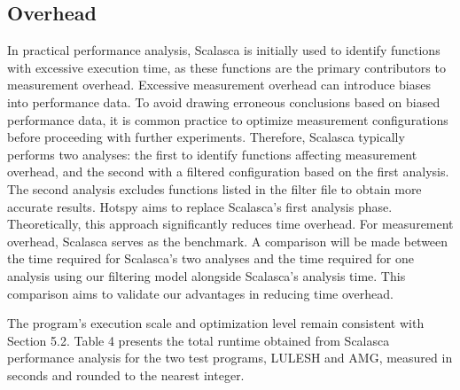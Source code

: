 \documentclass[lineno,sn-mathphys]{sn-jnl}%
\theoremstyle{thmstyleone}%
\theoremstyle{thmstyletwo}%
\theoremstyle{thmstylethree}%
\begin{document}
 \subsection{Overhead}
 In practical performance analysis, Scalasca is initially used to identify functions with excessive execution time, as these functions are the primary contributors to measurement overhead. Excessive measurement overhead can introduce biases into performance data. To avoid drawing erroneous conclusions based on biased performance data, it is common practice to optimize measurement configurations before proceeding with further experiments. Therefore, Scalasca typically performs two analyses: the first to identify functions affecting measurement overhead, and the second with a filtered configuration based on the first analysis. The second analysis excludes functions listed in the filter file to obtain more accurate results. Hotspy aims to replace Scalasca's first analysis phase. Theoretically, this approach significantly reduces time overhead. For measurement overhead, Scalasca serves as the benchmark. A comparison will be made between the time required for Scalasca's two analyses and the time required for one analysis using our filtering model alongside Scalasca's analysis time. This comparison aims to validate our advantages in reducing time overhead.\par
 The program's execution scale and optimization level remain consistent with Section 5.2. Table 4 presents the total runtime obtained from Scalasca performance analysis for the two test programs, LULESH and AMG, measured in seconds and rounded to the nearest integer.
\end{document}
